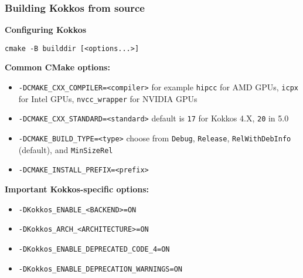 \begin{frame}[fragile]
\frametitle{Building Kokkos from source}
\textbf{Configuring Kokkos}

\begin{verbatim}
cmake -B builddir [<options...>]
\end{verbatim}

\scriptsize
\textbf{Common CMake options:}
\begin{itemize}
\item \texttt{-DCMAKE_CXX_COMPILER=<compiler>} for example \texttt{hipcc} for AMD GPUs, \texttt{icpx} for Intel GPUs, \texttt{nvcc\_wrapper} for NVIDIA GPUs
\item \texttt{-DCMAKE_CXX_STANDARD=<standard>} default is \texttt{17} for Kokkos 4.X, \texttt{20} in 5.0
\item \texttt{-DCMAKE_BUILD_TYPE=<type>} choose from \texttt{Debug}, \texttt{Release}, \texttt{RelWithDebInfo} (default), and \texttt{MinSizeRel}
\item \texttt{-DCMAKE_INSTALL_PREFIX=<prefix>}
\end{itemize}

\textbf{Important Kokkos-specific options:}
\begin{itemize}
\item \texttt{-DKokkos_ENABLE_<BACKEND>=ON}
\item \texttt{-DKokkos_ARCH_<ARCHITECTURE>=ON}
\item \texttt{-DKokkos_ENABLE_DEPRECATED_CODE_4=ON}
\item \texttt{-DKokkos_ENABLE_DEPRECATION_WARNINGS=ON}
\end{itemize}

\end{frame}

